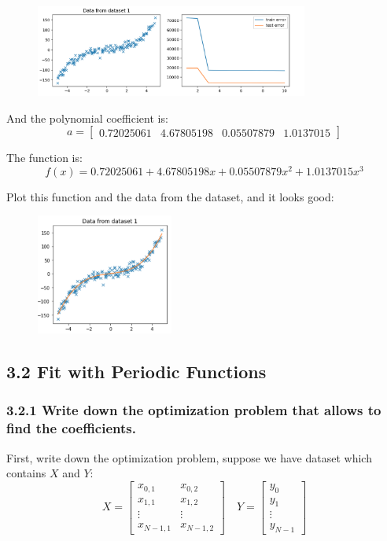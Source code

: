 \documentclass{article}
\begin{document}
\begin{figure}[ht]
    \centering
    \includegraphics[width=0.8\textwidth]{imgs/1.png}
\end{figure}

And the polynomial coefficient is:
\[ a = \begin{bmatrix}
    0.72025061 & 4.67805198 & 0.05507879 & 1.0137015
\end{bmatrix}\]

The function is: 
\[ f(x) = 0.72025061 + 4.67805198 x + 0.05507879 x^2 + 1.0137015 x^3 \]

Plot this function and the data from the dataset, and it looks good:
\begin{figure}[ht]
    \centering
    \includegraphics[width=0.4\textwidth]{imgs/2.png}
\end{figure}

\subsection*{3.2 Fit with Periodic Functions}

\subsubsection*{3.2.1 Write down the optimization problem that allows to find the coefficients.}

First, write down the optimization problem, suppose we have dataset which contains \( X \) and \( Y \):
\[ X = 
    \begin{bmatrix} 
        x_{0,1}& x_{0,2} \\
        x_{1,1}& x_{1,2} \\
        \vdots&\vdots \\
        x_{N-1,1}& x_{N-1,2}
    \end{bmatrix}
\quad
Y = \begin{bmatrix} y_0 \\ y_1 \\ \vdots \\ y_{N-1} \end{bmatrix} \]
\end{document}

